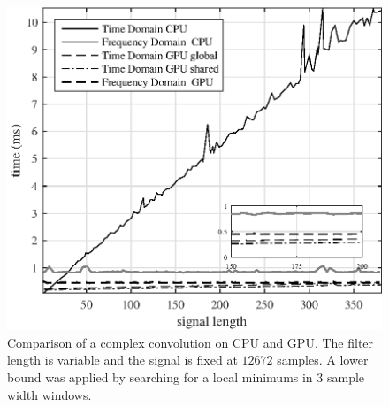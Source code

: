 \begin{figure}
	\centering\includegraphics[width=5in]{figures/gpu_intro/CPUvsGPU_1batch_12672signal_varyFilter.eps}
	\caption{Comparison of a complex convolution on CPU and GPU. The filter length is variable and the signal is fixed at $12672$ samples. A lower bound was applied by searching for a local minimums in 3 sample width windows.}
	\label{fig:CPUvsGPU_1batch_12672signal_varyFilter}
\end{figure}

